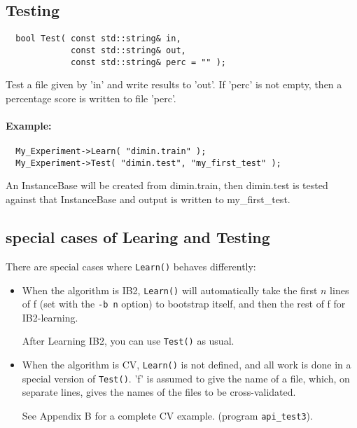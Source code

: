\subsection{Testing}
\begin{footnotesize}
\begin{verbatim}
  bool Test( const std::string& in,
             const std::string& out,
             const std::string& perc = "" );
\end{verbatim}
\end{footnotesize}

Test a file given by 'in' and write results to 'out'. If 'perc' is not
empty, then a percentage score is written to file 'perc'.

\paragraph{Example:}
\begin{footnotesize}
\begin{verbatim}
  My_Experiment->Learn( "dimin.train" );  
  My_Experiment->Test( "dimin.test", "my_first_test" );  
\end{verbatim}
\end{footnotesize}

An InstanceBase will be created from dimin.train, then dimin.test is
tested against that InstanceBase and output is written to
my\_first\_test.

\subsection{special cases of Learing and Testing}
There are special cases where {\tt Learn()} behaves differently:

\begin{itemize}
\item When the algorithm is IB2, {\tt Learn()} will automatically take the
first $n$ lines of f (set with the {\tt -b n} option) to bootstrap itself,
and then the rest of f for IB2-learning. 

After Learning IB2, you can use {\tt Test()} as usual.

\item When the algorithm is CV, {\tt Learn()} is not defined, and all
  work is done in a special version of {\tt Test()}. 'f' is assumed to
  give the name of a file, which, on separate lines, gives the names
  of the files to be cross-validated.

See Appendix B for a complete CV example. (program {\tt api\_test3}).
\end{itemize}

